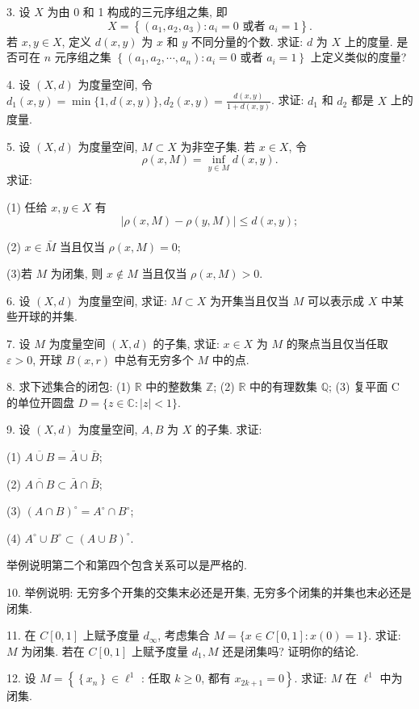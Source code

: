 \documentclass[openany]{ctexbook}
\theoremstyle{kaiti}
\theoremstyle{normal}
\begin{document}
3. 设 $X$ 为由 0 和 1 构成的三元序组之集, 即
$$
X=\left\{\left(a_1, a_2, a_3\right): a_{i}=0 \text { 或者 } a_{i}=1\right\}.
$$
若 $x, y \in X$, 定义 $d(x, y)$ 为 $x$ 和 $y$ 不同分量的个数. 求证: $d$ 为 $X$ 上的度量. 是否可在 $n$ 元序组之集 $\left\{\left(a_1, a_2, \cdots, a_n\right): a_{i}=0\right.$ 或者 $\left.a_{i}=1\right\}$ 上定义类似的度量?

4. 设 $(X, d)$ 为度量空间, 令 $d_1(x, y)=\min \{1, d(x, y)\}, d_2(x, y)=\frac{d(x, y)}{1+d(x, y)}$. 求证: $d_1$ 和 $d_2$ 都是 $X$ 上的度量.

5. 设 $(X, d)$ 为度量空间, $M \subset X$ 为非空子集. 若 $x \in X$, 令
$$
\rho(x, M)=\inf_{y \in M} d(x, y).
$$
求证:

(1) 任给 $x, y \in X$ 有
$$
|\rho(x, M)-\rho(y, M)| \leqslant d(x, y) ;
$$

(2) $x \in \bar{M}$ 当且仅当 $\rho(x, M)=0$;

(3)若 $M$ 为闭集, 则 $x \notin M$ 当且仅当 $\rho(x, M)>0$.

6. 设 $(X, d)$ 为度量空间, 求证: $M \subset X$ 为开集当且仅当 $M$ 可以表示成 $X$ 中某些开球的并集.

7. 设 $M$ 为度量空间 $(X, d)$ 的子集, 求证: $x \in X$ 为 $M$ 的聚点当且仅当任取 $\varepsilon>0$, 开球 $B(x, r)$ 中总有无穷多个 $M$ 中的点.

8. 求下述集合的闭包:
(1) $\mathbb{R}$ 中的整数集 $\mathbb{Z}$;
(2) $\mathbb{R}$ 中的有理数集 $\mathbb{Q}$;
(3) 复平面 C 的单位开圆盘 $D=\{z \in \mathbb{C}:|z|<1\}$.

9. 设 $(X, d)$ 为度量空间, $A, B$ 为 $X$ 的子集. 求证:

(1) $\overline{A \cup B}=\bar{A} \cup \bar{B}$;

(2) $\overline{A \cap B} \subset \bar{A} \cap \bar{B}$;

(3) $(A \cap B)^{\circ}=A^{\circ} \cap B^{\circ}$;

(4) $A^{\circ} \cup B^{\circ} \subset(A \cup B)^{\circ}$.

举例说明第二个和第四个包含关系可以是严格的.

10. 举例说明: 无穷多个开集的交集末必还是开集, 无穷多个闭集的并集也末必还是闭集.

11. 在 $C[0,1]$ 上赋予度量 $d_{\infty}$, 考虑集合 $M=\{x \in C[0,1]: x(0)=1\}$. 求证: $M$ 为闭集. 若在 $C[0,1]$ 上赋予度量 $d_1, M$ 还是闭集吗? 证明你的结论.

12. 设 $M=\left\{\left\{x_n\right\} \in \ell^1\right.$ : 任取 $k \geqslant 0$, 都有 $\left.x_{2 k+1}=0\right\}$. 求证: $M$ 在 $\ell^1$ 中为闭集.
\end{document}
